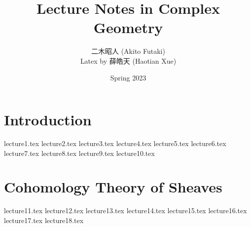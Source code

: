 \documentclass[twoside,12pt]{book}
\title{\Huge Lecture Notes in Complex Geometry}
\author{{\Large 二木昭人} (Akito Futaki)\\
Latex by 薛皓天 (Haotian Xue)}
\date{\Large Spring 2023}
\begin{document}
\maketitle
\frontmatter
\tableofcontents
\newpage
\mainmatter{}

\chapter{Introduction}
{lecture1.tex}
{lecture2.tex}
{lecture3.tex}
{lecture4.tex}
{lecture5.tex}
{lecture6.tex}
{lecture7.tex}
{lecture8.tex}
{lecture9.tex}
{lecture10.tex}
\chapter{Cohomology Theory of Sheaves}
{lecture11.tex}
{lecture12.tex}
{lecture13.tex}
{lecture14.tex}
{lecture15.tex}
{lecture16.tex}
{lecture17.tex}
{lecture18.tex}
\end{document}
